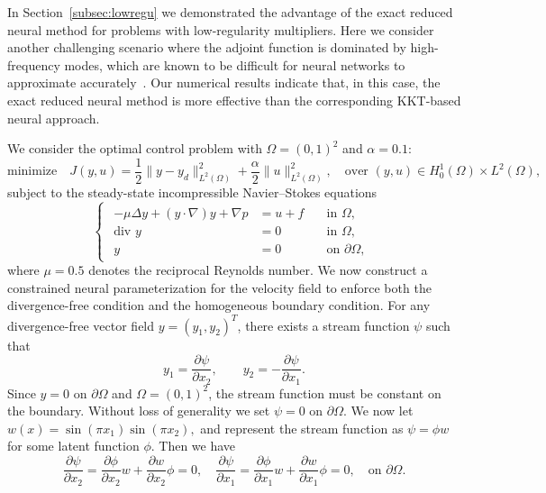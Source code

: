 \documentclass{article}
\numberwithin{equation}{section}
\begin{document}
In Section~\ref{subsec:lowregu} we demonstrated the advantage of the exact reduced neural method for problems with low-regularity multipliers. Here we consider another challenging scenario where the adjoint function is dominated by high-frequency modes, which are known to be difficult for neural networks to approximate accurately~\cite{xu2025overview}. Our numerical results indicate that, in this case, the exact reduced neural method is more effective than the corresponding KKT-based neural approach.

We consider the optimal control problem with $\Omega=(0,1)^2$ and $\alpha=0.1$:
\begin{equation}
\text{minimize}\quad J(y,u)=\frac12\|y-y_d\|^2_{L^2(\Omega)}+\frac{\alpha}{2}\|u\|^2_{L^2(\Omega)},
\quad
\text{over }(y,u)\in H^1_0(\Omega)\times L^2(\Omega),
\end{equation}
subject to the steady-state incompressible Navier--Stokes equations
\begin{equation}
    \begin{cases}
    \begin{aligned}
        -\mu \Delta y+(y\cdot\nabla)y+\nabla p &= u +f\quad &\text{in } \Omega,\\
        \text{div } y&=0\quad &\text{in }\Omega,\\
        y&=0\quad &\text{on }\partial\Omega,
        \end{aligned}
    \end{cases}
\end{equation}
where $\mu=0.5$ denotes the reciprocal Reynolds number. We now construct a constrained neural parameterization for the velocity field to enforce both the divergence-free condition and the homogeneous boundary condition. For any divergence-free vector field $y=(y_1,y_2)^T$, there exists a stream function $\psi$ such that
\begin{equation}
y_1=\frac{\partial\psi}{\partial x_2},
\qquad
y_2=-\frac{\partial\psi}{\partial x_1}.
\end{equation}
Since $y=0$ on $\partial\Omega$ and $\Omega=(0,1)^2$, the stream function must be constant on the boundary. Without loss of generality we set $\psi=0$ on $\partial\Omega$. We now let $w(x)=\sin(\pi x_1)\sin(\pi x_2),$ and represent the stream function as $\psi = \phi w$ for some latent function $\phi$. Then we have 
\begin{equation}
    \frac{\partial \psi}{\partial x_2}=\frac{\partial\phi}{\partial x_2}w + \frac{\partial w}{\partial x_2}\phi=0,\quad \frac{\partial \psi}{\partial x_1}=\frac{\partial\phi}{\partial x_1}w + \frac{\partial w}{\partial x_1}\phi=0,\quad \text{on }\partial\Omega.
\end{equation}
\end{document}
